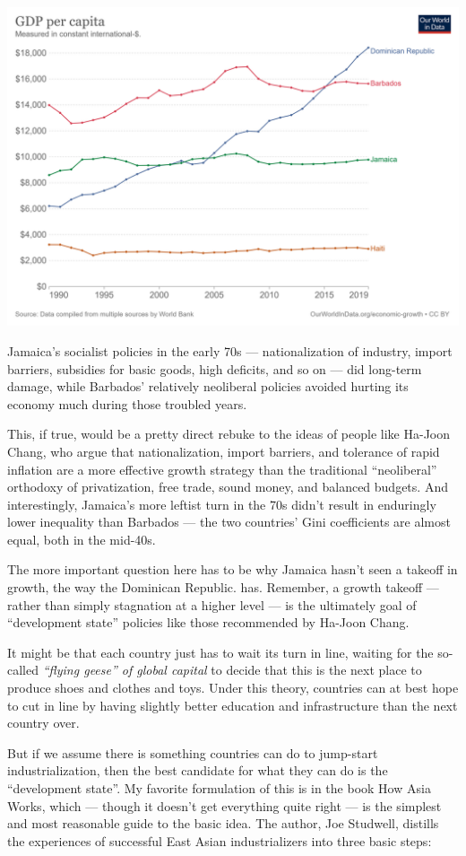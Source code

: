 \documentclass[
]{book}
\begin{document}
\includegraphics{fig/Jamaica.png}

Jamaica's socialist policies in the early 70s --- nationalization of industry, import barriers, subsidies for basic goods, high deficits, and so on --- did long-term damage, while Barbados' relatively neoliberal policies avoided hurting its economy much during those troubled years.

This, if true, would be a pretty direct rebuke to the ideas of people like Ha-Joon Chang, who argue that nationalization, import barriers, and tolerance of rapid inflation are a more effective growth strategy than the traditional ``neoliberal'' orthodoxy of privatization, free trade, sound money, and balanced budgets. And interestingly, Jamaica's more leftist turn in the 70s didn't result in enduringly lower inequality than Barbados --- the two countries' Gini coefficients are almost equal, both in the mid-40s.

The more important question here has to be why Jamaica hasn't seen a takeoff in growth, the way the Dominican Republic. has. Remember, a growth takeoff --- rather than simply stagnation at a higher level --- is the ultimately goal of ``development state'' policies like those recommended by Ha-Joon Chang.

It might be that each country just has to wait its turn in line, waiting for the so-called \emph{``flying geese'' of global capital} to decide that this is the next place to produce shoes and clothes and toys. Under this theory, countries can at best hope to cut in line by having slightly better education and infrastructure than the next country over.

But if we assume there is something countries can do to jump-start industrialization, then the best candidate for what they can do is the ``development state''. My favorite formulation of this is in the book How Asia Works, which --- though it doesn't get everything quite right --- is the simplest and most reasonable guide to the basic idea. The author, Joe Studwell, distills the experiences of successful East Asian industrializers into three basic steps:
\end{document}

